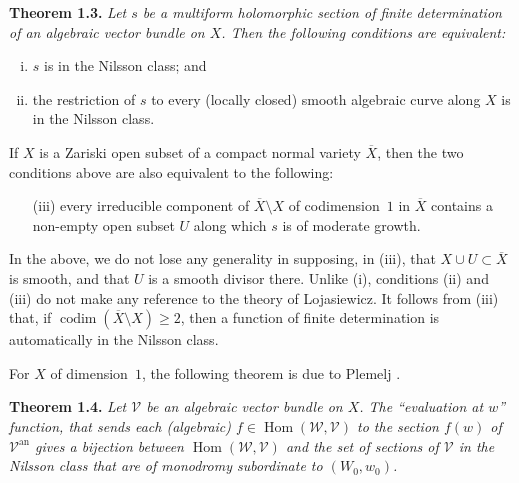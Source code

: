 \documentclass{report}
\newenvironment{itenv}[1]
  {\phantomsection\par\medskip\noindent\textbf{#1.}\itshape}
  {\par\medskip}
\newcommand{\scr}[1]{{\mathscr{#1}}}
\renewcommand{\cal}[1]{{\mathcal{#1}}}
\newcommand{\an}{\mathrm{an}}
\renewcommand{\geq}{\geqslant}
\DeclareMathOperator{\Hom}{Hom}
\DeclareMathOperator{\codim}{codim}
\newcommand{\oldpage}[1]{\marginpar{\footnotesize$\Big\vert$ \textit{p.~#1}}}
\begin{document}
\begin{itenv}{Theorem 1.3}
\label{III.1.3}
  Let $s$ be a multiform holomorphic section of finite determination of an algebraic vector bundle on $X$.
  Then the following conditions are equivalent:
  \begin{enumerate}[(i)]
    \item $s$ is in the Nilsson class; and
    \item the restriction of $s$ to every (locally closed) smooth algebraic curve along $X$ is in the Nilsson class.
  \end{enumerate}
\oldpage{123}
  If $X$ is a Zariski open subset of a compact normal variety $\overline{X}$, then the two conditions above are also equivalent to the following:
  \begin{enumerate}
    \item[{\rm(iii)}] every irreducible component of $\overline{X}\setminus X$ of codimension~$1$ in $\overline{X}$ contains a non-empty open subset $U$ along which $s$ is of moderate growth.
  \end{enumerate}
\end{itenv}

In the above, we do not lose any generality in supposing, in (iii), that $X\cup U\subset\overline{X}$ is smooth, and that $U$ is a smooth divisor there.
Unlike (i), conditions (ii) and (iii) do not make any reference to the theory of Lojasiewicz.
It follows from (iii) that, if $\codim(\overline{X}\setminus X)\geq2$, then a function of finite determination is automatically in the Nilsson class.

For $X$ of dimension~$1$, the following theorem is due to Plemelj \cite{23}.

\begin{itenv}{Theorem 1.4}
\label{III.1.4}
  Let $\cal{V}$ be an algebraic vector bundle on $X$.
  The ``evaluation at $w$'' function, that sends each (algebraic) $f\in\Hom(\scr{W},\cal{V})$ to the section $f(w)$ of $\cal{V}^\an$ gives a bijection between $\Hom(\scr{W},\cal{V})$ and the set of sections of $\cal{V}$ in the Nilsson class that are of monodromy subordinate to $(W_0,w_0)$.
\end{itenv}
\end{document}
